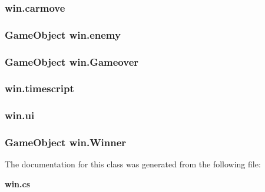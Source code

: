 \subsubsection[{carmove}]{ win.\+carmove}\label{classwin_aac5150e84eb4a79439cc46010046ff8d}
\subsubsection[{enemy}]{\setlength{\rightskip}{0pt plus 5cm}Game\+Object win.\+enemy}\label{classwin_a819f4bb2d2fdee854d0a8175b51032d7}
\subsubsection[{Gameover}]{\setlength{\rightskip}{0pt plus 5cm}Game\+Object win.\+Gameover}\label{classwin_a01cbafe3ffc00b6bbd63e741458afbfc}
\subsubsection[{timescript}]{ win.\+timescript}\label{classwin_a0e72cd36d97166e5286b848fa89c1158}
\subsubsection[{ui}]{ win.\+ui}\label{classwin_a54f909978bc38855d36d97c0efd7797f}
\subsubsection[{Winner}]{\setlength{\rightskip}{0pt plus 5cm}Game\+Object win.\+Winner}\label{classwin_af166b386d36c28abb193057b4c75739d}


The documentation for this class was generated from the following file\+:\begin{DoxyCompactItemize}
\item 
{\bf win.\+cs}\end{DoxyCompactItemize}
